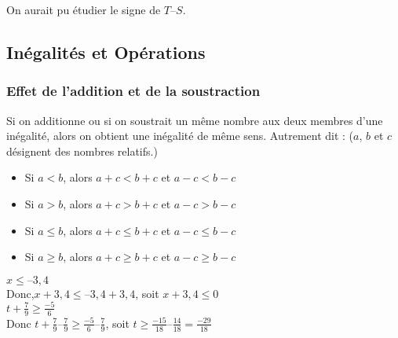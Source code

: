 \documentclass[10pt]{article}
\begin{document}
{\begin{Rq}
On aurait pu étudier le signe de $T – S$.
\end{Rq}
				
\subsection{Inégalités et Opérations}
\subsubsection{Effet de l'addition et de la soustraction}
\begin{shaded}
\begin{Pp}
Si on additionne ou si on soustrait un même nombre aux deux membres d'une inégalité, alors on obtient une inégalité de même sens.
Autrement dit : ($a$, $b$ et $c$ désignent des nombres relatifs.)
\begin{itemize}
\item Si $a<b$, alors $a+c<b+c$ et $a-c<b-c$    	
\item Si $a>b$, alors $a+c>b+c$ et $a-c>b-c$
\item Si $a\leqslant b$, alors $a+c\leqslant b+c$ et $a-c\leqslant b-c$
\item Si $a\geqslant b$, alors $a+c\geqslant b+c$ et $a-c\geqslant b-c$
\end{itemize}
\end{Pp}
\end{shaded}


\begin{Ex}
\begin{multicols}{2}	
$x\leqslant –3,4$\\
Donc,$x + 3,4\leqslant –3,4 + 3,4$, soit $x + 3,4\leqslant 0$\\ 

$t +\frac{7}{9} \geqslant \frac{-5}{6}$\\
Donc $t +\frac{7}{9} –\frac{7}{9}\geqslant \frac{-5}{6}–\frac{7}{9}$, soit $t\geqslant \frac{-15}{18}–\frac{14}{18}= \frac{-29}{18}$
\end{multicols}
\end{Ex}


}
\end{document}
